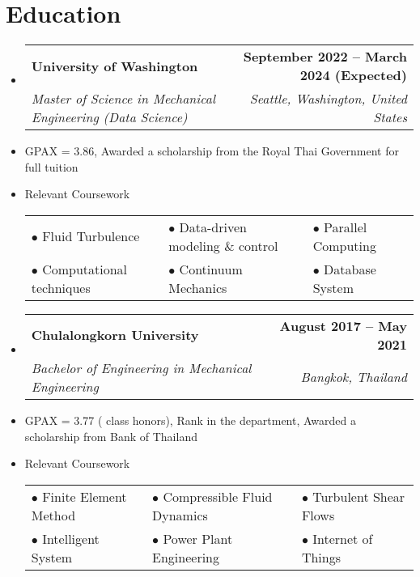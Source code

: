 \documentclass[letterpaper,11pt]{article}
\makeatletter
\newcommand{\resumeSubheading}[4]{
  \vspace{-2pt}\item
    \begin{tabular*}{1.0\textwidth}[t]{l@{\extracolsep{\fill}}r}
      \textbf{#1} & \textbf{\small #2} \\
      \textit{\small#3} & \textit{\small #4} \\
    \end{tabular*}\vspace{-7pt}
}
\newcommand{\resumeSubHeadingListStart}{\begin{itemize}[leftmargin=0.0in, label={}]}
\newcommand{\resumeSubHeadingListEnd}{\end{itemize}}
\makeatother
\begin{document}
\section{Education}
  \resumeSubHeadingListStart
    \resumeSubheading
      {University of Washington}{September 2022 -- March 2024 (Expected)}
      {Master of Science in Mechanical Engineering (Data Science)}{Seattle, Washington, United States}
      \item GPAX = 3.86, Awarded a scholarship from the Royal Thai Government for full tuition
      \item \vspace{-7pt}Relevant Coursework
      \begin{tabularx}{0.8\textwidth} { 
         >{\raggedright\arraybackslash}X 
         >{\raggedright\arraybackslash}X 
         >{\raggedright\arraybackslash}X  }
       \small $\bullet$ Fluid Turbulence & \small $\bullet$ Data-driven modeling \& control & \small $\bullet$ Parallel Computing \\
       \small $\bullet$ Computational techniques  & \small $\bullet$ Continuum Mechanics  & \small $\bullet$ Database System  \\
      \end{tabularx}
      \resumeSubheading
    {Chulalongkorn University}{August 2017 -- May 2021}
    {Bachelor of Engineering in Mechanical Engineering}{Bangkok, Thailand}
    \item GPAX = 3.77 ( class honors), Rank  in the department, Awarded a scholarship from Bank of Thailand
    \item \vspace{-7pt}Relevant Coursework
    \begin{tabularx}{0.8\textwidth} { 
       >{\raggedright\arraybackslash}X 
       >{\raggedright\arraybackslash}X 
       >{\raggedright\arraybackslash}X  }
     \small $\bullet$ Finite Element Method & \small $\bullet$ Compressible Fluid Dynamics & \small $\bullet$ Turbulent Shear Flows \\
     \small $\bullet$ Intelligent System  & \small $\bullet$ Power Plant Engineering  & \small $\bullet$ Internet of Things  \\
    \end{tabularx}
  \resumeSubHeadingListEnd
\end{document}
